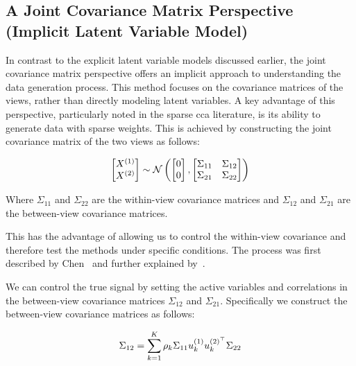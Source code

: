 \subsection{A Joint Covariance Matrix Perspective (Implicit Latent Variable Model)}\label{subsubsec:a-joint-covariance-matrix-perspective}

In contrast to the explicit latent variable models discussed earlier, the joint covariance matrix perspective offers an implicit approach to understanding the data generation process.
This method focuses on the covariance matrices of the views, rather than directly modeling latent variables.
A key advantage of this perspective, particularly noted in the sparse \acrshort{cca} literature, is its ability to generate data with sparse weights.
This is achieved by constructing the joint covariance matrix of the two views as follows:

\begin{align}\label{eq:covariance}
    \begin{bmatrix} X^{(1)} \\ X^{(2)} \end{bmatrix} \sim \mathcal{N} \left( \begin{bmatrix} 0 \\ 0 \end{bmatrix}, \begin{bmatrix} \Sigma_{11} & \Sigma_{12} \\ \Sigma_{21} & \Sigma_{22} \end{bmatrix} \right)
\end{align}

Where $\Sigma_{11}$ and $\Sigma_{22}$ are the within-view covariance matrices and $\Sigma_{12}$ and $\Sigma_{21}$ are the between-view covariance matrices.

This has the advantage of allowing us to control the within-view covariance and therefore test the methods under specific conditions.
The process was first described by Chen~\citep{chen2013sparse} and further explained by~\citep{suo2017sparse}.

We can control the true signal by setting the active variables and correlations in the between-view covariance matrices $\Sigma_{12}$ and $\Sigma_{21}$.
Specifically we construct the between-view covariance matrices as follows:

\begin{align}
    \Sigma_{12}=\sum_{k=1}^{K}\rho_k\Sigma_{11}u^{(1)}_{k}u^{(2)^{\top}}_k\Sigma_{22}
\end{align}

